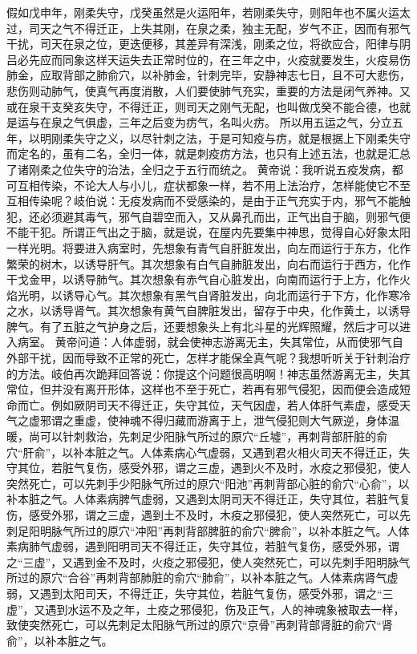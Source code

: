 \documentclass[12pt,UTF8]{ctexbook}
\begin{document}
假如戊申年，刚柔失守，戊癸虽然是火运阳年，若刚柔失守，则阳年也不属火运太过，司天之气不得迁正，上失其刚，在泉之柔，独主无配，岁气不正，因而有邪气干扰，司天在泉之位，更迭便移，其差异有深浅，刚柔之位，将欲应合，阳律与阴吕必先应而同象这样天运失去正常时位的，在三年之中，火疫就要发生，火疫易伤肺金，应取背部之肺俞穴，以补肺金，针刺完毕，安静神志七日，且不可大悲伤，悲伤则动肺气，使真气再度消散，人们要使肺气充实，重要的方法是闭气养神。又或在泉干支癸亥失守，不得迁正，则司天之刚气无配，也叫做戊癸不能合德，也就是运与在泉之气俱虚，三年之后变为疠气，名叫火疠。
所以用五运之气，分立五年，以明刚柔失守之义，以尽针刺之法，于是可知疫与疠，就是根据上下刚柔失守而定名的，虽有二名，全归一体，就是刺疫疠方法，也只有上述五法，也就是汇总了诸刚柔之位失守的治法，全归之于五行而统之。
黄帝说：我听说五疫发病，都可互相传染，不论大人与小儿，症状都象一样，若不用上法治疗，怎样能使它不至互相传染呢？岐伯说：无疫发病而不受感染的，是由于正气充实于内，邪气不能触犯，还必须避其毒气，邪气自碧空而入，又从鼻孔而出，正气出自于脑，则邪气便不能干犯。所谓正气出之于脑，就是说，在屋内先要集中神思，觉得自心好象太阳一样光明。将要进入病室时，先想象有青气自肝脏发出，向左而运行于东方，化作繁荣的树木，以诱导肝气。其次想象有白气自肺脏发出，向右而运行于西方，化作干戈金甲，以诱导肺气。其次想象有赤气自心脏发出，向南而运行于上方，化作火焰光明，以诱导心气。其次想象有黑气自肾脏发出，向北而运行于下方，化作寒冷之水，以诱导肾气。其次想象有黄气自脾脏发出，留存于中央，化作黄土，以诱导脾气。有了五脏之气护身之后，还要想象头上有北斗星的光辉照耀，然后才可以进入病室。
黄帝问道：人体虚弱，就会使神志游离无主，失其常位，从而使邪气自外部干扰，因而导致不正常的死亡，怎样才能保全真气呢？我想听听关于针刺治疗的方法。岐伯再次跪拜回答说：你提这个问题很高明啊！神志虽然游离无主，失其常位，但并没有离开形体，这样也不至于死亡，若再有邪气侵犯，因而便会造成短命而亡。例如厥阴司天不得迁正，失守其位，天气因虚，若人体肝气素虚，感受天气之虚邪谓之重虚，使神魂不得归藏而游离于上，泄气侵犯则大气厥逆，身体温暖，尚可以针刺救治，先刺足少阳脉气所过的原穴“丘墟”，再刺背部肝脏的俞穴“肝俞”，以补本脏之气。人体素病心气虚弱，又遇到君火相火司天不得迁正，失守其位，若脏气复伤，感受外邪，谓之三虚，遇到火不及时，水疫之邪侵犯，使人突然死亡，可以先刺手少阳脉气所过的原穴“阳池”再刺背部心脏的俞穴“心俞”，以补本脏之气。人体素病脾气虚弱，又遇到太阴司天不得迁正，失守其位，若脏气复伤，感受外邪，谓之三虚，遇到土不及时，木疫之邪侵犯，使人突然死亡，可以先刺足阳明脉气所过的原穴“冲阳”再刺背部脾脏的俞穴“脾俞”，以补本脏之气。人体素病肺气虚弱，遇到阳明司天不得迁正，失守其位，若脏气复伤，感受外邪，谓之“三虚”，又遇到金不及时，火疫之邪侵犯，使人突然死亡，可以先刺手阳明脉气所过的原穴“合谷”再刺背部肺脏的俞穴“肺俞”，以补本脏之气。人体素病肾气虚弱，又遇到太阳司天，不得迁正，失守其位，若脏气复伤，感受外邪，谓之“三虚”，又遇到水运不及之年，土疫之邪侵犯，伤及正气，人的神魂象被取去一样，致使突然死亡，可以先刺足太阳脉气所过的原穴“京骨”再刺背部肾脏的俞穴“肾俞”，以补本脏之气。
\end{document}
